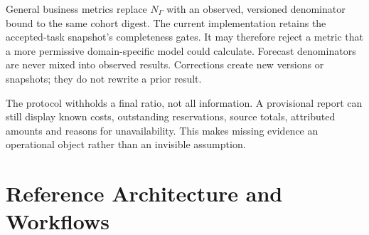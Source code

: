 \documentclass[10pt,twocolumn]{article}
\begin{document}
General business metrics replace $N_\Gamma$ with an observed, versioned denominator bound to the same cohort digest. The current implementation retains the accepted-task snapshot's completeness gates. It may therefore reject a metric that a more permissive domain-specific model could calculate. Forecast denominators are never mixed into observed results. Corrections create new versions or snapshots; they do not rewrite a prior result.

The protocol withholds a final ratio, not all information. A provisional report can still display known costs, outstanding reservations, source totals, attributed amounts and reasons for unavailability. This makes missing evidence an operational object rather than an invisible assumption.

\section{Reference Architecture and Workflows}
\label{sec:architecture}
\end{document}
